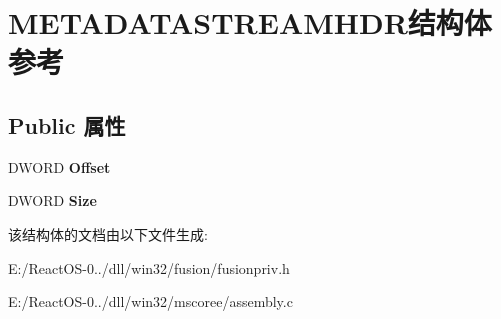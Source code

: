 \hypertarget{struct_m_e_t_a_d_a_t_a_s_t_r_e_a_m_h_d_r}{}\section{M\+E\+T\+A\+D\+A\+T\+A\+S\+T\+R\+E\+A\+M\+H\+D\+R结构体 参考}
\label{struct_m_e_t_a_d_a_t_a_s_t_r_e_a_m_h_d_r}
\subsection*{Public 属性}
\begin{DoxyCompactItemize}
\item 
\mbox{\label{struct_m_e_t_a_d_a_t_a_s_t_r_e_a_m_h_d_r_a758ade42559123bdf8c6d41fc98f6829}} 
D\+W\+O\+RD {\bfseries Offset}
\item 
\mbox{\label{struct_m_e_t_a_d_a_t_a_s_t_r_e_a_m_h_d_r_ad142af13445a7271e5188ac3fa89b46b}} 
D\+W\+O\+RD {\bfseries Size}
\end{DoxyCompactItemize}


该结构体的文档由以下文件生成\+:\begin{DoxyCompactItemize}
\item 
E\+:/\+React\+O\+S-\/0../dll/win32/fusion/fusionpriv.\+h\item 
E\+:/\+React\+O\+S-\/0../dll/win32/mscoree/assembly.\+c\end{DoxyCompactItemize}
